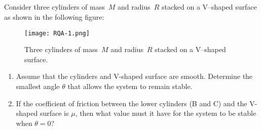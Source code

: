 \documentclass[a4paper,justified,oneside]{tufte-handout}
\numberwithin{equation}{subsection}
\begin{document}
\subsection{}\label{A5:sec:inclined_cylinders}
Consider three cylinders of mass~$M$ and radius~$R$ stacked on a V--shaped surface as shown in the following figure:
\begin{figure}
	\centering
	\texttt{[image: RQA-1.png]}
	\caption{Three cylinders of mass~$M$ and radius~$R$ stacked on a V--shaped surface.}
	\label{A5:fig:Q1}
\end{figure}
\begin{enumerate}
	\item Assume that the cylinders and V-shaped surface are smooth. Determine the smallest angle $\theta$ that allows the system to remain stable.
	\item If the coefficient of friction between the lower cylinders (B and C) and the V-shaped surface is $\mu$, then what value must it have for the system to be stable when $\theta=0$?
\end{enumerate}
\end{document}
